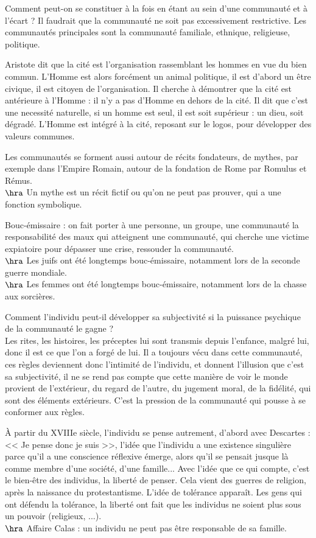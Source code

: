 \documentclass[11pt]{article}
\begin{document}
Comment peut-on se constituer à la fois en étant au sein d'une communauté et à l'écart ? Il faudrait que la communauté ne soit pas excessivement restrictive.
Les communautés principales sont la communauté familiale, ethnique, religieuse, politique.

Aristote dit que la cité est l'organisation rassemblant les hommes en vue du bien commun. L'Homme est alors forcément un animal politique, il est d'abord un être civique, il est citoyen de l'organisation. Il cherche à démontrer que la cité est antérieure à l'Homme : il n'y a pas d'Homme en dehors de la cité. Il dit que c'est une necessité naturelle, si un homme est seul, il est soit supérieur : un dieu, soit dégradé. L'Homme est intégré à la cité, reposant sur le logos, pour développer des valeurs communes. 

Les communautés se forment aussi autour de récits fondateurs, de mythes, par exemple dans l'Empire Romain, autour de la fondation de Rome par Romulus et Rémus.\\
$\hra$ Un mythe est un récit fictif ou qu'on ne peut pas prouver, qui a une fonction symbolique.

Bouc-émissaire : on fait porter à une personne, un groupe, une communauté la responsabilité des maux qui atteignent une communauté, qui cherche une victime expiatoire pour dépasser une crise, ressouder la communauté.\\
$\hra$ Les juifs ont été longtemps bouc-émissaire, notamment lors de la seconde guerre mondiale.\\
$\hra$ Les femmes ont été longtemps bouc-émissaire, notamment lors de la chasse aux sorcières.

Comment l'individu peut-il développer sa subjectivité si la puissance psychique de la communauté le gagne ?\\
Les rites, les histoires, les préceptes lui sont transmis depuis l'enfance, malgré lui, donc il est ce que l'on a forgé de lui. Il a toujours vécu dans cette communauté, ces règles deviennent donc l'intimité de l'individu, et donnent l'illusion que c'est sa subjectivité, il ne se rend pas compte que cette manière de voir le monde provient de l'extérieur, du regard de l'autre, du jugement moral, de la fidélité, qui sont des éléments extérieurs. C'est la pression de la communauté qui pousse à se conformer aux règles.

À partir du XVIIIe siècle, l'individu se pense autrement, d'abord avec Descartes : << Je pense donc je suis >>, l'idée que l'individu a une existence singulière parce qu'il a une conscience réflexive émerge, alors qu'il se pensait jusque là comme membre d'une société, d'une famille... Avec l'idée que ce qui compte, c'est le bien-être des individus, la liberté de penser. Cela vient des guerres de religion, après la naissance du protestantisme. L'idée de tolérance apparaît. Les gens qui ont défendu la tolérance, la liberté ont fait que les individus ne soient plus sous un pouvoir (religieux, ...).\\
$\hra$ Affaire Calas : un individu ne peut pas être responsable de sa famille.
\end{document}
